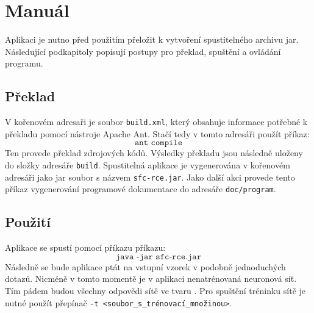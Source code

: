 \documentclass[a4paper, 11pt, titlepage]{article}
\begin{document}
\section{Manuál}
Aplikaci je nutno před použitím přeložit k vytvoření spustitelného archivu jar. Následující podkapitoly popisují postupy pro překlad, spuštění a ovládání programu.

\subsection{Překlad}
V kořenovém adresaři je soubor \texttt{build.xml}, který obsahuje informace potřebné k překladu pomocí nástroje Apache Ant. Stačí tedy v tomto adresáři použít příkaz:
$$\texttt{ant compile}$$
Ten provede překlad zdrojových kódů. Výsledky překladu jsou následně uloženy do složky adresáře \texttt{build}. Spustitelná aplikace je vygenerována v kořenovém adresáři jako jar soubor s názvem \texttt{sfc-rce.jar}. Jako další akci provede tento příkaz vygenerování programové dokumentace do adresáře \texttt{doc/program}.\cite{antApache}

\subsection{Použití}
Aplikace se spustí pomocí příkazu příkazu:
$$\texttt{java -jar sfc-rce.jar}$$
Následně se bude aplikace ptát na vstupní vzorek v podobně jednoduchých dotazů. Nicméně v tomto momentě je v aplikaci nenatrénovaná neuronová síť. Tím pádem budou všechny odpovědi sítě ve tvaru . Pro spuštění tréninku sítě je nutné použít přepínač \texttt{-t <soubor\_s\_trénovací\_množinou>}.
\end{document}
